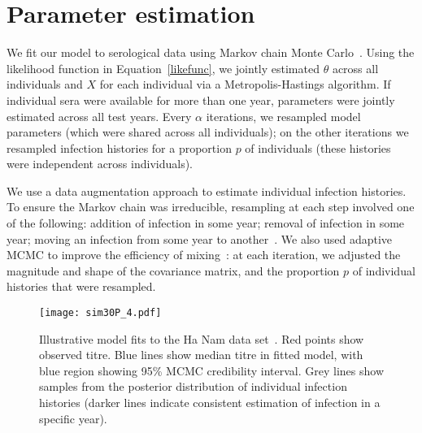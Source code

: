 \documentclass[12pt]{article}
\begin{document}
\section{Parameter estimation}

We fit our model to serological data using Markov chain Monte Carlo~\cite{gilks1996markov}. Using the likelihood function in Equation~\ref{likefunc}, we jointly estimated $\theta$ across all individuals and $X$ for each individual via a Metropolis-Hastings algorithm. If individual sera were available for more than one year, parameters were jointly estimated across all test years. Every $\alpha$ iterations, we resampled model parameters (which were shared across all individuals); on the other iterations we resampled infection histories for a proportion $p$ of individuals (these histories were independent across individuals).

We use a data augmentation approach to estimate individual infection histories. To ensure the Markov chain was irreducible, resampling at each step involved one of the following: addition of infection in some year; removal of infection in some year; moving an infection from some year to another~\cite{gibson1998estimating}. We also used adaptive MCMC to improve the efficiency of mixing~\cite{Roberts:2009wg}: at each iteration, we adjusted the magnitude and shape of the covariance matrix, and the proportion $p$ of individual histories that were resampled.





\begin{figure}[htbp]
\begin{center}
  \texttt{[image: sim30P\_4.pdf]} 
\caption{Illustrative model fits to the Ha Nam data set~\cite{fonville2014antibody}. Red points show observed titre. Blue lines show median titre in fitted model, with blue region showing 95\% MCMC credibility interval. Grey lines show samples from the posterior distribution of individual infection histories (darker lines indicate consistent estimation of infection in a specific year).}
\label{default}
\end{center}
\end{figure}
\end{document}
